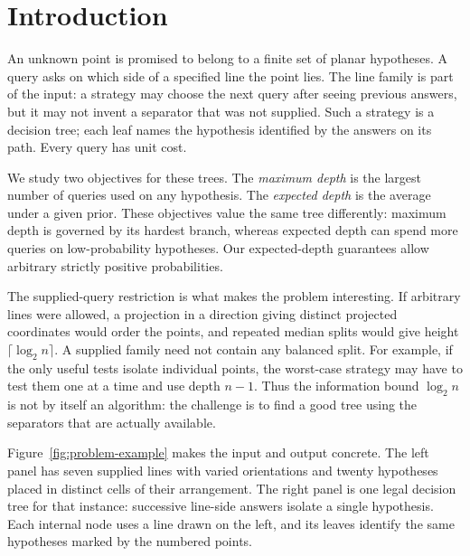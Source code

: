 \section{Introduction}

An unknown point is promised to belong to a finite set of planar
hypotheses. A query asks on which side of a specified line the point
lies. The line family is part of the input: a strategy may choose the
next query after seeing previous answers, but it may not invent a
separator that was not supplied. Such a strategy is a decision tree;
each leaf names the hypothesis identified by the answers on its path.
Every query has unit cost.

We study two objectives for these trees. The \emph{maximum depth} is
the largest number of queries used on any hypothesis. The
\emph{expected depth} is the average under a given prior. These
objectives value the same tree differently: maximum depth is governed
by its hardest branch, whereas expected depth can spend more queries
on low-probability hypotheses. Our expected-depth guarantees allow
arbitrary strictly positive probabilities.

The supplied-query restriction is what makes the problem
interesting. If arbitrary lines were allowed, a projection in a
direction giving distinct projected coordinates would order the
points, and repeated median splits
would give height $\lceil\log_2 n\rceil$. A supplied family need not
contain any balanced split. For example, if the only useful tests
isolate individual points, the worst-case strategy may have to test
them one at a time and use depth $n-1$. Thus the information bound
$\log_2 n$ is not by itself an algorithm: the challenge is to find a
good tree using the separators that are actually available.

Figure~\ref{fig:problem-example} makes the input and output concrete.
The left panel has seven supplied lines with varied orientations and
twenty hypotheses placed in distinct cells of their arrangement.
The right panel is one legal decision tree for that instance:
successive line-side answers isolate a single hypothesis. Each internal
node uses a line drawn on the left, and its leaves identify the same
hypotheses marked by the numbered points.

